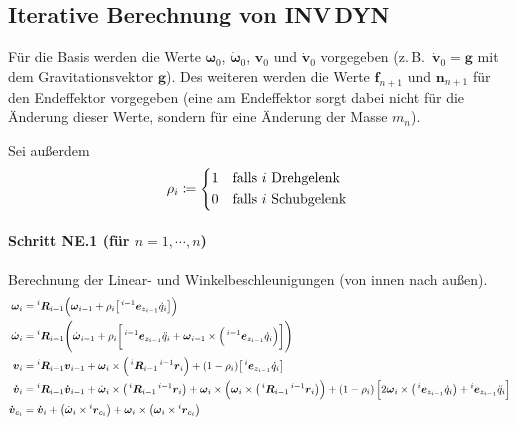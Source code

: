 \documentclass[a4paper, 11pt, accentcolor = tud3b]{tudreport}
\newcommand{\inreferenceto}[2]{\prescript{#1}{}{#2}}
\newcommand{\mat}[1]{\boldsymbol{#1}}
\renewcommand{\vec}[1]{\boldsymbol{#1}}
\newcommand{\zB}{z.\,B.~}
\begin{document}
			\subsection{Iterative Berechnung von INV\,DYN}
				Für die Basis werden die Werte \( \vec{\omega}_0 \), \( \dot{\vec{\omega}}_0 \), \( \vec{v}_0 \) und \( \vec{\dot{v}}_0 \) vorgegeben (\zB \( \vec{\dot{v}}_0 = \vec{g} \) mit dem Gravitationsvektor \(\vec{g}\)). Des weiteren werden die Werte \( \vec{f}_{n + 1} \) und \( \vec{n}_{n + 1} \) für den Endeffektor vorgegeben (eine am Endeffektor sorgt dabei nicht für die Änderung dieser Werte, sondern für eine Änderung der Masse \(m_n\)).
				
				Sei außerdem
				\begin{equation*}
					\rho_i \coloneqq
						\begin{cases*}
							1 & falls \(i\) Drehgelenk \\
							0 & falls \(i\) Schubgelenk
						\end{cases*}
				\end{equation*}
				
				\paragraph{Schritt NE.1 (für \( n = 1, \cdots, n \))}
					Berechnung der Linear- und Winkelbeschleunigungen (von innen nach außen).
					\begin{align*}
						\vec{\omega}_i &= \inreferenceto{i}{\mat{R}}_{i - 1} \Big( \vec{\omega}_{i - 1} + \rho_i \big[ \inreferenceto{i - 1}{\vec{e}}_{z_{i - 1}} \dot{q}_i \big] \Big) \\
						\dot{\vec{\omega}}_i &= \inreferenceto{i}{\mat{R}}_{i - 1} \Bigg( \dot{\vec{\omega}}_{i - 1} + \rho_i \bigg[ \inreferenceto{i - 1}{\vec{e}}_{z_{i - 1}} \ddot{q}_i + \vec{\omega}_{i - 1} \times \Big( \inreferenceto{i - 1}{\vec{e}}_{z_{i - 1}} \dot{q}_i \Big) \bigg] \Bigg) \\
						\vec{v}_i &= \inreferenceto{i}{\mat{R}}_{i - 1} \vec{v}_{i - 1} + \vec{\omega}_i \times \Big( \inreferenceto{i}{\mat{R}}_{i - 1} \inreferenceto{i - 1}{\vec{r}}_i \Big) + (1 - \rho_i) \big[ \inreferenceto{i}{\vec{e}}_{z_{i - 1}} \dot{q}_i \big] \\
						\vec{\dot{v}}_i &= \inreferenceto{i}{\mat{R}}_{i - 1} \vec{\dot{v}}_{i - 1} + \dot{\vec{\omega}}_i \times \big( \inreferenceto{i}{\mat{R}}_{i - 1} \inreferenceto{i - 1}{\vec{r}}_i \big) + \vec{\omega}_i \times \Big( \vec{\omega}_i \times \big( \inreferenceto{i}{\mat{R}}_{i - 1} \inreferenceto{i - 1}{\vec{r}}_i \big) \Big) + (1 - \rho_i) \, \Big[ 2\vec{\omega}_i \times \big( \inreferenceto{i}{\vec{e}}_{z_{i - 1}} \dot{q}_i \big) + \inreferenceto{i}{\vec{e}}_{z_{i - 1}} \ddot{q}_i \Big] \\
						\vec{\dot{v}}_{c_i} &= \vec{\dot{v}}_i + \big(\dot{\vec{\omega}}_i \times \inreferenceto{i}{\vec{r}}_{c_i}\big) + \vec{\omega}_i \times \big( \vec{\omega}_i \times \inreferenceto{i}{\vec{r}}_{c_i} \big)
					\end{align*}
				
\end{document}
